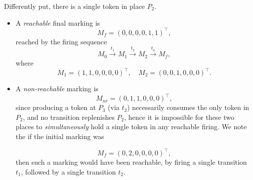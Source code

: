 Differently put, there is a single token in place $P_2$.


\begin{itemize}
	\item A \emph{reachable} final marking is
	\[
	M_f = (0,0,0,0,1,1)^\top,
	\]
	reached by the firing sequence
	\[
	M_0 \xrightarrow{t_1} M_1
	\xrightarrow{t_2} M_2
	\xrightarrow{t_4} M_f,
	\]
	where
	\[
	M_1 = (1,1,0,0,0,0)^\top,
	\quad
	M_2 = (0,0,1,0,0,0)^\top.
	\]
	\item A \emph{non‐reachable} marking is
	\[
	M_{nr} = (0,1,1,0,0,0)^\top,
	\]
	since producing a token at \(P_3\) (via \(t_2\)) necessarily consumes the only token in \(P_2\), and no transition replenishes \(P_2\), hence it is impossible for these two places to \textit{simultaneously} hold a single token in any reachable firing. We note the if the initial marking was 
	
	\[
	M_f = (0,2,0,0,0,0)^\top,
	\]
	then such a marking would have been reachable, by firing a single transition $t_1$, followed by a single transition $t_2$.
\end{itemize}






\newpage